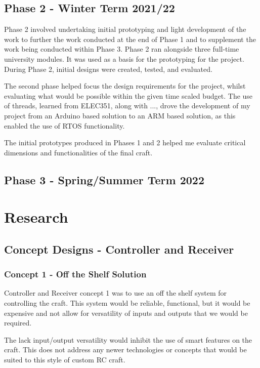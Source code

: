 \documentclass [11pt]{article}
\begin{document}
\subsection{Phase 2 - Winter Term 2021/22}

Phase 2 involved undertaking initial prototyping and light development of the work to further the work conducted at the end of Phase 1 and to supplement the work being conducted within Phase 3. Phase 2 ran alongside three full-time university modules. It was used as a basis for the prototyping for the project. During Phase 2, initial designs were created, tested, and evaluated. 

The second phase helped focus the design requirements for the project, whilst evaluating what would be possible within the given time scaled budget. The use of threads, learned from ELEC351, along with ..., drove the development of my project from an Arduino based solution to an ARM based solution, as this enabled the use of RTOS functionality. 

The initial prototypes produced in Phases 1 and 2 helped me evaluate critical dimensions and functionalities of the final craft.

\subsection{Phase 3 - Spring/Summer Term 2022} 

\section{Research}

\subsection{Concept Designs - Controller and Receiver}
\subsubsection{Concept 1 - Off the Shelf Solution}
Controller and Receiver concept 1 was to use an off the shelf system for controlling the craft. This system would be reliable, functional, but it would be expensive and not allow for versatility of inputs and outputs that we would be required. 

The lack input/output versatility would inhibit the use of smart features on the craft. This does not address any newer technologies or concepts that would be suited to this style of custom RC craft. 
\end{document}
